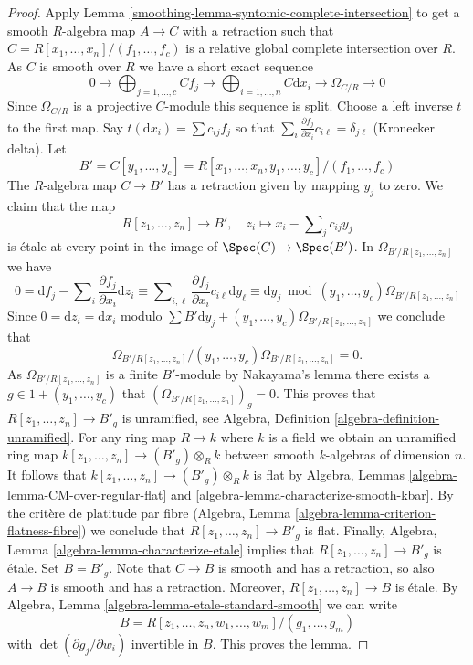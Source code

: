 \begin{proof}

Apply Lemma \ref{smoothing-lemma-syntomic-complete-intersection}
to get a smooth $R$-algebra map $A \to C$ with a retraction such that
$C = R[x_1, \ldots, x_n]/(f_1, \ldots, f_c)$
is a relative global complete intersection over $R$. As $C$ is smooth
over $R$ we have a short exact sequence
$$
0 \to
\bigoplus\nolimits_{j = 1, \ldots, c} C f_j \to
\bigoplus\nolimits_{i = 1, \ldots, n} C\text{d}x_i \to
\Omega_{C/R} \to 0
$$
Since $\Omega_{C/R}$ is a projective $C$-module this sequence is split.
Choose a left inverse $t$ to the first map. Say
$t(\text{d}x_i) = \sum c_{ij} f_j$
so that $\sum_i \frac{\partial f_j}{\partial x_i} c_{i\ell} = \delta_{j\ell}$
(Kronecker delta). Let
$$
B' = C[y_1, \ldots, y_c] =
R[x_1, \ldots, x_n, y_1, \ldots, y_c]/(f_1, \ldots, f_c)
$$
The $R$-algebra map $C \to B'$ has a retraction given by mapping $y_j$ to zero.
We claim that the map
$$
R[z_1, \ldots, z_n] \longrightarrow B',\quad
z_i \longmapsto x_i - \sum\nolimits_j c_{ij} y_j
$$
is \'etale at every point in the image of $\Spec(C) \to \Spec(B')$.
In $\Omega_{B'/R[z_1, \ldots, z_n]}$ we have
$$
0 =
\text{d}f_j - \sum\nolimits_i \frac{\partial f_j}{\partial x_i} \text{d}z_i
\equiv
\sum\nolimits_{i, \ell}
\frac{\partial f_j}{\partial x_i} c_{i\ell} \text{d}y_\ell
\equiv
\text{d}y_j \bmod (y_1, \ldots, y_c)\Omega_{B'/R[z_1, \ldots, z_n]}
$$
Since $0 = \text{d}z_i = \text{d}x_i$ modulo
$\sum B'\text{d}y_j + (y_1, \ldots, y_c)\Omega_{B'/R[z_1, \ldots, z_n]}$
we conclude that
$$
\Omega_{B'/R[z_1, \ldots, z_n]}/
(y_1, \ldots, y_c)\Omega_{B'/R[z_1, \ldots, z_n]} = 0.
$$
As $\Omega_{B'/R[z_1, \ldots, z_n]}$ is a finite $B'$-module
by Nakayama's lemma there exists a $g \in 1 + (y_1, \ldots, y_c)$
that $(\Omega_{B'/R[z_1, \ldots, z_n]})_g = 0$. This proves that
$R[z_1, \ldots, z_n] \to B'_g$ is unramified, see
Algebra, Definition \ref{algebra-definition-unramified}.
For any ring map $R \to k$ where $k$ is a field we obtain an
unramified ring map $k[z_1, \ldots, z_n] \to (B'_g) \otimes_R k$
between smooth $k$-algebras of dimension $n$. It follows that
$k[z_1, \ldots, z_n] \to (B'_g) \otimes_R k$ is flat by
Algebra, Lemmas \ref{algebra-lemma-CM-over-regular-flat} and
\ref{algebra-lemma-characterize-smooth-kbar}. By the crit\`ere
de platitude par fibre
(Algebra, Lemma \ref{algebra-lemma-criterion-flatness-fibre})
we conclude that $R[z_1, \ldots, z_n] \to B'_g$ is flat.
Finally, Algebra, Lemma \ref{algebra-lemma-characterize-etale}
implies that $R[z_1, \ldots, z_n] \to B'_g$ is \'etale.
Set $B = B'_g$. Note that $C \to B$ is smooth and has a retraction,
so also $A \to B$ is smooth and has a retraction.
Moreover, $R[z_1, \ldots, z_n] \to B$ is \'etale.
By Algebra, Lemma \ref{algebra-lemma-etale-standard-smooth}
we can write
$$
B = R[z_1, \ldots, z_n, w_1, \ldots, w_m]/(g_1, \ldots, g_m)
$$
with $\det(\partial g_j/\partial w_i)$ invertible in $B$.
This proves the lemma.
\end{proof}

